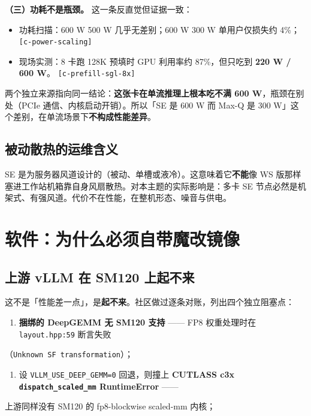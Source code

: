 \textbf{（三）功耗不是瓶颈。} 这一条反直觉但证据一致：


\begin{itemize}
  \item 功耗扫描：600 W  500 W 几乎无差别；600 W  300 W 单用户仅损失约 4\%； {\scriptsize\texttt{[c-\hspace{0pt}power-\hspace{0pt}scaling]}}
  \item 现场实测：8 卡跑 128K 预填时 GPU 利用率约 87\%，但只吃到 \textbf{220 W / 600 W}。 {\scriptsize\texttt{[c-\hspace{0pt}prefill-\hspace{0pt}sgl-\hspace{0pt}8x]}}
\end{itemize}

两个独立来源指向同一结论：\textbf{这张卡在单流推理上根本吃不满 600 W}，瓶颈在别处（PCIe 通信、内核启动开销）。所以「SE 是 600 W 而 Max-Q 是 300 W」这个差别，在单流场景下\textbf{不构成性能差异}。


\subsection{被动散热的运维含义}

SE 是为服务器风道设计的（被动、单槽或液冷）。这意味着它\textbf{不能}像 WS 版那样塞进工作站机箱靠自身风扇散热。对本主题的实际影响是：多卡 SE 节点必然是机架式、有强风道。代价不在性能，在整机形态、噪音与供电。



\section{软件：为什么必须自带魔改镜像}

\subsection{上游 vLLM 在 SM120 上起不来}

这不是「性能差一点」，是\textbf{起不来}。社区做过逐条对账，列出四个独立阻塞点：


\begin{enumerate}
  \item \textbf{捆绑的 DeepGEMM 无 SM120 支持} —— FP8 权重处理时在 \texttt{layout.hpp:59} 断言失败
\end{enumerate}
   （\texttt{Unknown\allowbreak{} SF\allowbreak{} transformation}）；

\begin{enumerate}
  \item 设 \texttt{VLLM\_USE\_DEEP\_GEMM=0} 回退，则撞上 \textbf{CUTLASS c3x \texttt{dispatch\_scaled\_mm} RuntimeError} ——
\end{enumerate}
   上游同样没有 SM120 的 fp8-blockwise scaled-mm 内核；


